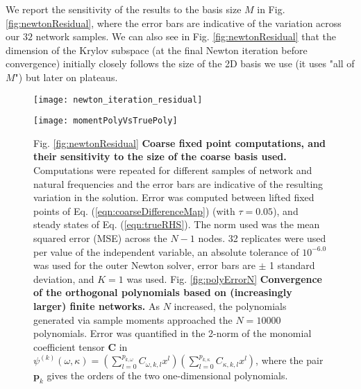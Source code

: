 \documentclass[numbers]{frontiersSCNS}
\renewcommand{\vec}[1]{\bm{#1}}
\newcommand{\mat}[1]{{\mathbf{#1}}}
\newcommand{\degree}{\kappa}
\newcommand{\numNodes}{{N}}
\newcommand{\couplingK}{{K}}
\newcommand{\numCofs}{{M}}
\newcommand{\basisFuncSymbol}{\psi}
\newcommand{\basisFunc}[1]{\basisFuncSymbol^{(#1)}}
\newcommand{\figRef}[1]{Fig. \ref{fig:#1}}
\newcommand{\eqnRef}[1]{Eq. (\ref{eqn:#1})}
\newcommand{\scalarFuncIndex}{k}
\newcommand{\scalarFuncIndexAlt}{l}
\DeclareRobustCommand{\inTstep}{\tau}
\newcommand{\numReplicatesVal}{32}
\newcommand{\defaultKVal}{1}
\newcommand{\absTolPowVal}{-6.0}
\newcommand{\errBarTypeVal}{$\pm$ 1 standard deviation}
\newcommand{\bigBigNVal}{10000}
\newcommand{\flowTimeVal}{0.05}
\begin{document}
We report the sensitivity of the results to the basis size $\numCofs$ in \figRef{newtonResidual},
where the error bars are indicative of the variation across our $\numReplicatesVal$ network samples.
%
We can also see in \figRef{newtonResidual} that the dimension of the Krylov subspace
(at the final Newton iteration before convergence) initially closely follows
the size of the 2D basis we use (it uses "all of $\numCofs$") but later on plateaus.
%
%
\setcounter{subfigure}{0}\begin{figure}[ht]
\centering
\begin{minipage}[b]{.45\linewidth}
    \centering
    \texttt{[image: newton\_iteration\_residual]}\subcaption{}\label{fig:newtonResidual}
\end{minipage}
\begin{minipage}[b]{.45\linewidth}
    \centering
    \texttt{[image: momentPolyVsTruePoly]}\subcaption{}\label{fig:polyErrorN}
\end{minipage}
\caption{
    \figRef{newtonResidual}
    \textbf{ Coarse fixed point computations, and their sensitivity to the size of the coarse basis used.}
    Computations were repeated for different samples of network and natural frequencies and
    the error bars are indicative of the resulting variation in the solution.
    Error was computed between lifted fixed points of \eqnRef{coarseDifferenceMap} (with ${\inTstep}=\flowTimeVal$),
    and steady states of \eqnRef{trueRHS}.
    The norm used was the mean squared error (MSE) across the $N-1$ nodes.
    \numReplicatesVal{} replicates were used per value of the independent variable,
    an absolute tolerance of $10^{\absTolPowVal}$ was used for the outer Newton solver,
    error bars are \errBarTypeVal,
    and $\couplingK=\defaultKVal$ was used.
    \figRef{polyErrorN}
    \textbf{Convergence of the orthogonal polynomials based on (increasingly larger) finite networks.}
    As $\numNodes$ increased, the polynomials generated via sample moments approached
    the $\numNodes=\bigBigNVal$ polynomials.
    Error was quantified in the 2-norm
    of the monomial coefficient tensor $\mat C$
    in $\basisFunc{\scalarFuncIndex}(\omega, \degree) =
    \left(
     \sum_{{\scalarFuncIndexAlt}=0}^{p_{\scalarFuncIndex,\omega}} C_{\omega,{\scalarFuncIndex},{\scalarFuncIndexAlt}} x^{{\scalarFuncIndexAlt}}
     \right)
     \left(
     \sum_{{\scalarFuncIndexAlt}=0}^{p_{\scalarFuncIndex,\degree}} C_{\degree,{\scalarFuncIndex},{\scalarFuncIndexAlt}} x^{{\scalarFuncIndexAlt}}
     \right)
     $,
    where the pair $\vec p_{\scalarFuncIndex}$ gives the orders of the two one-dimensional polynomials.
}
\label{fig:coarseSteadyStateConvergence}
\end{figure}
%
\end{document}
